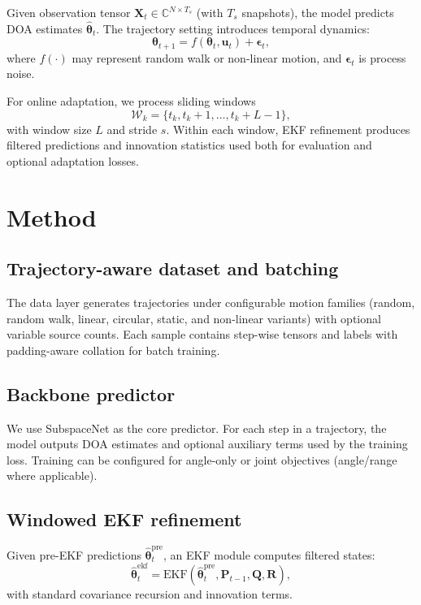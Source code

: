 \documentclass{article}
\begin{document}
Given observation tensor $\mathbf{X}_t \in \mathbb{C}^{N \times T_s}$ (with $T_s$ snapshots), the model predicts DOA estimates $\hat{\boldsymbol{\theta}}_t$.
The trajectory setting introduces temporal dynamics:
\begin{equation}
\boldsymbol{\theta}_{t+1} = f(\boldsymbol{\theta}_t, \mathbf{u}_t) + \boldsymbol{\epsilon}_t,
\end{equation}
where $f(\cdot)$ may represent random walk or non-linear motion, and $\boldsymbol{\epsilon}_t$ is process noise.

For online adaptation, we process sliding windows
\begin{equation}
\mathcal{W}_k = \{t_k, t_k+1, \dots, t_k + L - 1\},
\end{equation}
with window size $L$ and stride $s$.
Within each window, EKF refinement produces filtered predictions and innovation statistics used both for evaluation and optional adaptation losses.

\section{Method}
\subsection{Trajectory-aware dataset and batching}
The data layer generates trajectories under configurable motion families (random, random walk, linear, circular, static, and non-linear variants) with optional variable source counts.
Each sample contains step-wise tensors and labels with padding-aware collation for batch training.

\subsection{Backbone predictor}
We use SubspaceNet as the core predictor.
For each step in a trajectory, the model outputs DOA estimates and optional auxiliary terms used by the training loss.
Training can be configured for angle-only or joint objectives (angle/range where applicable).

\subsection{Windowed EKF refinement}
Given pre-EKF predictions $\hat{\boldsymbol{\theta}}^{\text{pre}}_t$, an EKF module computes filtered states:
\begin{equation}
\hat{\boldsymbol{\theta}}^{\text{ekf}}_t = \mathrm{EKF}\!\left(\hat{\boldsymbol{\theta}}^{\text{pre}}_t, \mathbf{P}_{t-1}, \mathbf{Q}, \mathbf{R}\right),
\end{equation}
with standard covariance recursion and innovation terms.
\end{document}
